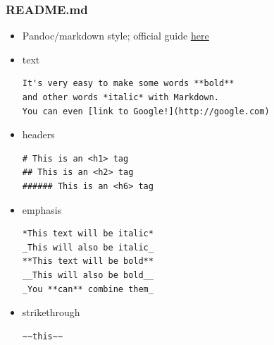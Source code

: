 \documentclass{beamer}
\begin{document}
\begin{frame}[fragile]
\frametitle{README.md}

\begin{itemize}
\item Pandoc/markdown style; official guide \href{https://guides.github.com/features/mastering-markdown/}{\underline{here}}

\item text
\tiny
\begin{verbatim}
It's very easy to make some words **bold** 
and other words *italic* with Markdown. 
You can even [link to Google!](http://google.com)
\end{verbatim}
\normalsize

\item headers
\tiny
\begin{verbatim}
# This is an <h1> tag
## This is an <h2> tag
###### This is an <h6> tag
\end{verbatim}
\normalsize

\item emphasis
\tiny
\begin{verbatim}
*This text will be italic*
_This will also be italic_
**This text will be bold**
__This will also be bold__
_You **can** combine them_
\end{verbatim}
\normalsize

\item strikethrough
\tiny
\begin{verbatim}
~~this~~
\end{verbatim}
\normalsize

\end{itemize}

\end{frame}
\end{document}
